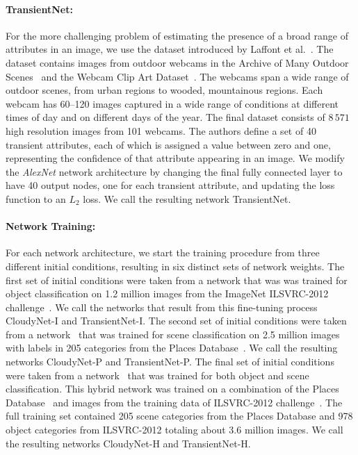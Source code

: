 \documentclass[10pt,twocolumn,letterpaper]{article}
\begin{document}
\paragraph{TransientNet:} For the more challenging problem of estimating the
presence of a broad range of attributes in an image, we use the dataset
introduced by Laffont et al.~\cite{Laffont14}.  The dataset contains images
from outdoor webcams in the Archive of Many Outdoor Scenes~\cite{jacobs07amos}
and the Webcam Clip Art Dataset~\cite{lalondesig09}.  The webcams span a wide
range of outdoor scenes, from urban regions to wooded, mountainous regions.
Each webcam has 60--120 images captured in a wide range of conditions at
different times of day and on different days of the year.  The final dataset
consists of $8\,571$ high resolution images from 101 webcams.  The authors
define a set of 40 transient attributes, each of which is assigned a value
between zero and one, representing the confidence of that attribute appearing
in an image. We modify the \emph{AlexNet} network architecture by changing the final
fully connected layer to have 40 output nodes, one for each transient
attribute, and updating the loss function to an $L_2$ loss. We call the
resulting network TransientNet. 

\vspace{-1em}
\paragraph{Network Training:} For each network architecture, we start the training procedure from three different initial conditions,
resulting in six distinct sets of network weights. The first set of initial
conditions were taken from a network that was was trained for object
classification on 1.2 million images from the ImageNet ILSVRC-2012
challenge~\cite{ILSVRCarxiv14}.  We call the networks that result from this
fine-tuning process CloudyNet-I and TransientNet-I.  The second set of initial
conditions were taken from a network~\cite{zhou2014places} that was trained for
scene classification on 2.5 million images with labels in 205 categories from
the Places Database~\cite{zhou2014places}. We call the resulting networks
CloudyNet-P and TransientNet-P.  The final set of initial conditions were taken
from a network~\cite{zhou2014places} that was trained for both object and scene
classification.  This hybrid network was trained on a combination of the Places
Database~\cite{zhou2014places} and images from the training data of ILSVRC-2012
challenge~\cite{ILSVRCarxiv14}.  The full training set contained 205 scene
categories from the Places Database and 978 object categories from ILSVRC-2012
totaling about 3.6 million images.  We call the resulting networks CloudyNet-H
and TransientNet-H.
\end{document}
